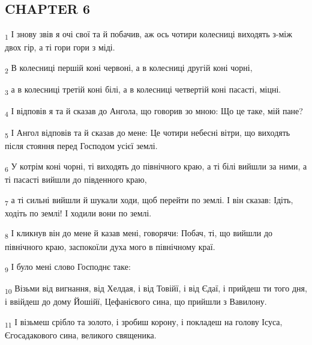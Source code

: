 \subsection{CHAPTER 6}
\begin{tcolorbox}
\textsubscript{1} І знову звів я очі свої та й побачив, аж ось чотири колесниці виходять з-між двох гір, а ті гори гори з міді.
\end{tcolorbox}
\begin{tcolorbox}
\textsubscript{2} В колесниці першій коні червоні, а в колесниці другій коні чорні,
\end{tcolorbox}
\begin{tcolorbox}
\textsubscript{3} а в колесниці третій коні білі, а в колесниці четвертій коні пасасті, міцні.
\end{tcolorbox}
\begin{tcolorbox}
\textsubscript{4} І відповів я та й сказав до Ангола, що говорив зо мною: Що це таке, мій пане?
\end{tcolorbox}
\begin{tcolorbox}
\textsubscript{5} І Ангол відповів та й сказав до мене: Це чотири небесні вітри, що виходять після стояння перед Господом усієї землі.
\end{tcolorbox}
\begin{tcolorbox}
\textsubscript{6} У котрім коні чорні, ті виходять до північного краю, а ті білі вийшли за ними, а ті пасасті вийшли до південного краю,
\end{tcolorbox}
\begin{tcolorbox}
\textsubscript{7} а ті сильні вийшли й шукали ходи, щоб перейти по землі. І він сказав: Ідіть, ходіть по землі! І ходили вони по землі.
\end{tcolorbox}
\begin{tcolorbox}
\textsubscript{8} І кликнув він до мене й казав мені, говорячи: Побач, ті, що вийшли до північного краю, заспокоїли духа мого в північному краї.
\end{tcolorbox}
\begin{tcolorbox}
\textsubscript{9} І було мені слово Господнє таке:
\end{tcolorbox}
\begin{tcolorbox}
\textsubscript{10} Візьми від вигнання, від Хелдая, і від Товійї, і від Єдаї, і прийдеш ти того дня, і ввійдеш до дому Йошійї, Цефанієвого сина, що прийшли з Вавилону.
\end{tcolorbox}
\begin{tcolorbox}
\textsubscript{11} І візьмеш срібло та золото, і зробиш корону, і покладеш на голову Ісуса, Єгосадакового сина, великого священика.
\end{tcolorbox}
